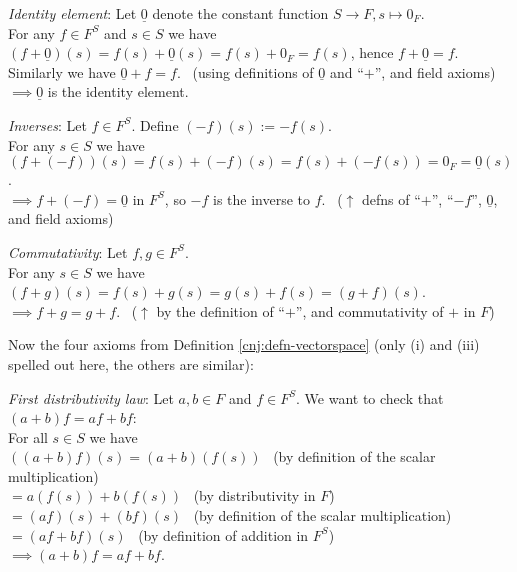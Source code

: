 \documentclass[
  12pt,
  a4paper,
  twoside]{article}
\theoremstyle{plain}
\theoremstyle{definition}
\begin{document}
\emph{Identity element}: Let \(\underline{0}\) denote the constant function \(S \to F, s \mapsto 0_{F}\).\\
For any \(f \in F^{S}\) and \(s\in S\) we have \((f + \underline{0})(s) = f(s) + \underline{0}(s) = f(s) + 0_{F} = f(s)\), hence \(f + \underline{0} = f\).\\
Similarly we have \(\underline{0} + f = f\). \hfill~{(using definitions of \(\underline{0}\) and ``\(+\)'', and field axioms)}\\
\(\implies \underline{0}\) is the identity element.

\emph{Inverses}: Let \(f \in F^{S}\). Define \((-f)(s) := -f(s)\).\\
For any \(s\in S\) we have \((f+(-f))(s) = f(s) + (-f)(s) = f(s) + (-f(s)) = 0_F = \underline{0}(s)\).\\
\(\implies f + (-f) = \underline{0}\) in \(F^{S}\), so \(-f\) is the inverse to \(f\). \hfill~{(\(\uparrow\) defns of ``\(+\)'', ``\(-f\)'', \(\underline{0}\), and field axioms)}

\emph{Commutativity}: Let \(f,g\in F^S\).\\
For any \(s\in S\) we have \((f+g)(s)=f(s)+g(s) = g(s) + f(s) = (g+f)(s)\).\\
\(\implies f+g=g+f\). \hfill~{(\(\uparrow\) by the definition of ``\(+\)'', and commutativity of \(+\) in \(F\))}

Now the four axioms from Definition \ref{cnj:defn-vectorspace} (only (i) and (iii) spelled out here, the others are similar):

\emph{First distributivity law}: Let \(a,b \in F\) and \(f \in F^{S}\). We want to check that \((a+b)f = af + bf\):\\
For all \(s \in S\) we have\\
\(((a+b)f)(s) = (a+b)(f(s))\) \hfill~{(by definition of the scalar multiplication)}\\
\hspace*{0.333em}\hspace*{0.333em}\hspace*{0.333em}\hspace*{0.333em} \(= a(f(s)) + b(f(s))\) \hfill~{(by distributivity in \(F\))}\\
\hspace*{0.333em}\hspace*{0.333em}\hspace*{0.333em}\hspace*{0.333em} \(= (af)(s) + (bf)(s)\) \hfill~{(by definition of the scalar multiplication)}\\
\hspace*{0.333em}\hspace*{0.333em}\hspace*{0.333em}\hspace*{0.333em} \(= (af + bf)(s)\) \hfill~{(by definition of addition in \(F^{S}\))}\\
\(\implies (a+b)f = af + bf\).
\end{document}
